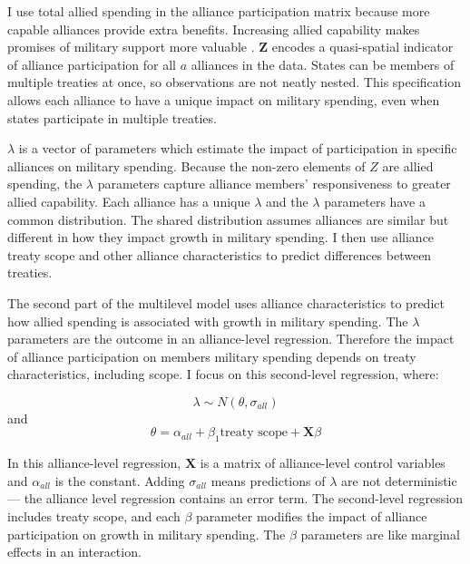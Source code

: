 \documentclass[12pt]{article}
\begin{document}
I use total allied spending in the alliance participation matrix because more capable alliances provide extra benefits.
Increasing allied capability makes promises of military support more valuable \citep{Johnsonetal2015}.  
$\textbf{Z}$ encodes a quasi-spatial indicator of alliance participation for all $a$ alliances in the data. 
States can be members of multiple treaties at once, so observations are not neatly nested. 
This specification allows each alliance to have a unique impact on military spending, even when states participate in multiple treaties. 


$\lambda$ is a vector of parameters which estimate the impact of participation in specific alliances on military spending. 
Because the non-zero elements of $Z$ are allied spending, the $\lambda$ parameters capture alliance members' responsiveness to greater allied capability. 
Each alliance has a unique $\lambda$ and the $\lambda$ parameters have a common distribution. 
The shared distribution assumes alliances are similar but different in how they impact growth in military spending. 
I then use alliance treaty scope and other alliance characteristics to predict differences between treaties. 


The second part of the multilevel model uses alliance characteristics to predict how allied spending is associated with growth in military spending. 
The $\lambda$ parameters are the outcome in an alliance-level regression.
Therefore the impact of alliance participation on members military spending depends on treaty characteristics, including scope. 
I focus on this second-level regression, where: 

\begin{equation}
\lambda \sim N(\theta, \sigma_{all})
\end{equation} 
and 
\begin{equation}
\theta = \alpha_{all} + \beta_1 \mbox{treaty scope} + \textbf{X} \beta
\end{equation}


In this alliance-level regression, $\textbf{X}$ is a matrix of alliance-level control variables and $\alpha_{all}$ is the constant.
Adding $\sigma_{all}$ means predictions of $\lambda$ are not deterministic--- the alliance level regression contains an error term. 
The second-level regression includes treaty scope, and each $\beta$ parameter modifies the impact of alliance participation on growth in military spending. 
The $\beta$ parameters are like marginal effects in an interaction. 
\end{document}
